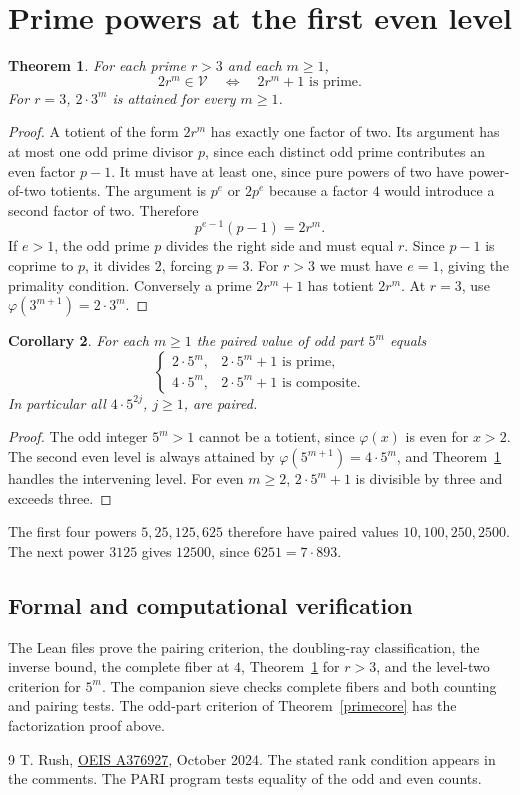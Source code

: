 \documentclass[11pt]{article}
\newtheorem{theorem}{Theorem}[section]
\newtheorem{corollary}[theorem]{Corollary}
\newcommand{\ph}{\varphi}
\newcommand{\V}{\mathcal V}
\begin{document}
\clearpage
\section{Prime powers at the first even level}
\begin{theorem}\label{level}
For each prime $r>3$ and each $m\ge1$,
\[
 2r^m\in\V \quad\Longleftrightarrow\quad 2r^m+1\text{ is prime}.
\]
For $r=3$, $2\cdot3^m$ is attained for every $m\ge1$.
\end{theorem}
\begin{proof}
A totient of the form $2r^m$ has exactly one factor of two. Its argument has at most one odd prime divisor $p$, since each distinct odd prime contributes an even factor $p-1$. It must have at least one, since pure powers of two have power-of-two totients. The argument is $p^e$ or $2p^e$ because a factor $4$ would introduce a second factor of two. Therefore
\[
 p^{e-1}(p-1)=2r^m.
\]
If $e>1$, the odd prime $p$ divides the right side and must equal $r$. Since $p-1$ is coprime to $p$, it divides $2$, forcing $p=3$. For $r>3$ we must have $e=1$, giving the primality condition. Conversely a prime $2r^m+1$ has totient $2r^m$. At $r=3$, use $\ph(3^{m+1})=2\cdot3^m$.
\end{proof}

\begin{corollary}
For each $m\ge1$ the paired value of odd part $5^m$ equals
\[
 \begin{cases}
 2\cdot5^m,&2\cdot5^m+1\text{ is prime},\\
 4\cdot5^m,&2\cdot5^m+1\text{ is composite}.
 \end{cases}
\]
In particular all $4\cdot5^{2j}$, $j\ge1$, are paired.
\end{corollary}
\begin{proof}
The odd integer $5^m>1$ cannot be a totient, since $\ph(x)$ is even for $x>2$. The second even level is always attained by $\ph(5^{m+1})=4\cdot5^m$, and Theorem~\ref{level} handles the intervening level. For even $m\ge2$, $2\cdot5^m+1$ is divisible by three and exceeds three.
\end{proof}
The first four powers $5,25,125,625$ therefore have paired values $10,100,250,2500$. The next power $3125$ gives $12500$, since $6251=7\cdot893$.

\subsection*{Formal and computational verification}
The Lean files prove the pairing criterion, the doubling-ray classification, the inverse bound, the complete fiber at $4$, Theorem~\ref{level} for $r>3$, and the level-two criterion for $5^m$. The companion sieve checks complete fibers and both counting and pairing tests. The odd-part criterion of Theorem~\ref{primecore} has the factorization proof above.
\begin{thebibliography}{9}\small
{} T. Rush, \href{https://oeis.org/A376927}{OEIS A376927}, October 2024. The stated rank condition appears in the comments. The PARI program tests equality of the odd and even counts.
\end{thebibliography}
\end{document}
